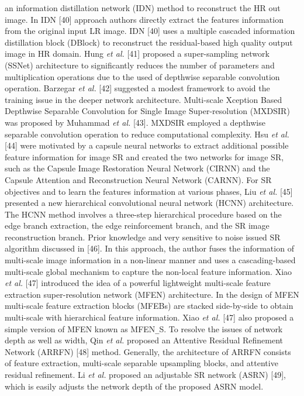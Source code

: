 \documentclass{ieeeaccess}
\begin{document}
an information distillation network (IDN) method to reconstruct the HR out image. In IDN [40] approach authors directly extract the features information from the original input LR image. IDN [40] uses a multiple cascaded information distillation block (DBlock) to reconstruct the residual-based high quality output image in HR domain. Hung \textit{et al.} [41] proposed a super-sampling network (SSNet) architecture to significantly reduces the number of parameters and multiplication operations due to the used of depthwise separable convolution operation. Barzegar \textit{et al.} [42] suggested a modest framework to avoid the training issue in the deeper network architecture. Multi-scale Xception Based Depthwise Separable Convolution for Single Image Super-resolution (MXDSIR) was proposed by Muhammad \textit{et al.} [43]. MXDSIR employed a depthwise separable convolution operation to reduce computational complexity. Hsu \textit{et al.} [44] were motivated by a capsule neural networks to extract additional possible feature information for image SR and created the two networks for image SR, such as the Capsule Image Restoration Neural Network (CIRNN) and the Capsule Attention and Reconstruction Neural Network (CARNN). For SR objectives and to learn the features information at various phases, Liu \textit{et al.} [45] presented a new hierarchical convolutional neural network (HCNN) architecture. The HCNN method involves a three-step hierarchical procedure based on the edge branch extraction, the edge reinforcement branch, and the SR image reconstruction branch. Prior knowledge and very sensitive to noise issued SR algorithm discussed in [46]. In this approach, the author fuses the information of multi-scale image information in a non-linear manner and uses a cascading-based multi-scale global mechanism to capture the non-local feature information. Xiao \textit{et al.} [47] introduced the idea of a powerful lightweight multi-scale feature extraction super-resolution network (MFEN) architecture. In the design of MFEN multi-scale feature extraction blocks (MFEBs) are stacked side-by-side to obtain multi-scale with hierarchical feature information. Xiao \textit{et al.} [47] also proposed a simple version of MFEN known as MFEN\texttt{\_}S.  To resolve the issues of network depth as well as width, Qin \textit{et al.} proposed an Attentive Residual Refinement Network (ARRFN) [48] method. Generally, the architecture of ARRFN consists of feature extraction, multi-scale separable upsampling blocks, and attentive residual refinement. Li \textit{et al.} proposed an adjustable SR network (ASRN) [49], which is easily adjusts the network depth of the proposed ASRN model.
\end{document}
